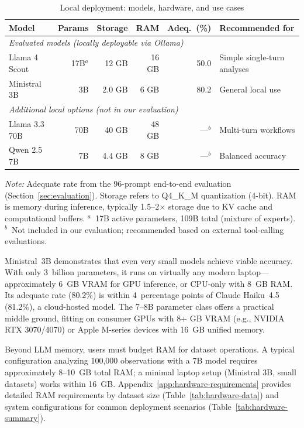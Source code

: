 \begin{table}[htbp]
\centering
\begin{threeparttable}
\caption{Local deployment: models, hardware, and use cases}
\label{tab:models}
\begin{tabular}{lrrrrl}
\toprule
Model & Params & Storage & RAM & Adeq.\ (\%) & Recommended for \\
\midrule
\multicolumn{6}{l}{\textit{Evaluated models (locally deployable via Ollama)}} \\
Llama 4 Scout   & 17B$^a$ & 12 GB & 16 GB & 50.0 & Simple single-turn analyses \\
Ministral 3B    & 3B      & 2.0 GB & 6 GB  & 80.2 & General local use \\
\midrule
\multicolumn{6}{l}{\textit{Additional local options (not in our evaluation)}} \\
Llama 3.3 70B   & 70B  & 40 GB & 48 GB & ---$^b$ & Multi-turn workflows \\
Qwen 2.5 7B     & 7B   & 4.4 GB & 8 GB  & ---$^b$ & Balanced accuracy \\
\bottomrule
\end{tabular}
\begin{tablenotes}[flushleft]
\item \emph{Note:} Adequate rate from the 96-prompt end-to-end
evaluation (Section~\ref{sec:evaluation}). Storage refers to Q4\_K\_M
quantization (4-bit). RAM is memory during inference, typically
1.5--2$\times$ storage due to KV cache and computational buffers.
$^a$~17B active parameters, 109B total (mixture of experts).
$^b$~Not included in our evaluation; recommended based on external
tool-calling evaluations.
\end{tablenotes}
\end{threeparttable}
\end{table}

Ministral~3B demonstrates that even very small models achieve viable
accuracy.  With only 3~billion parameters, it runs on virtually any
modern laptop---approximately 6~GB VRAM for GPU inference, or CPU-only
with 8~GB RAM.  Its adequate rate (80.2\%) is within 4~percentage
points of Claude Haiku~4.5 (81.2\%), a cloud-hosted model.
The 7--8B parameter class offers a practical middle ground,
fitting on consumer GPUs with 8+ GB VRAM (e.g., NVIDIA RTX 3070/4070)
or Apple M-series devices with 16~GB unified memory.

Beyond LLM memory, users must budget RAM for dataset operations.
A typical configuration analyzing 100,000 observations with a 7B
model requires approximately 8--10~GB total RAM; a minimal laptop
setup (Ministral 3B, small datasets) works within 16~GB.
Appendix~\ref{app:hardware-requirements} provides detailed RAM
requirements by dataset size
(Table~\ref{tab:hardware-data}) and system configurations for
common deployment scenarios (Table~\ref{tab:hardware-summary}).

